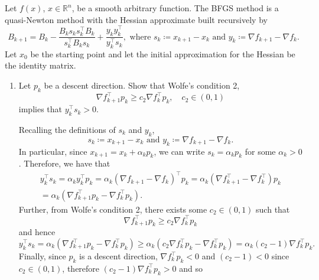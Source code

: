 \documentclass{../kin_math}
\begin{document}
\begin{questions}
  \question Let $f(x)$, $x \in \mathbb{R}^n$, be a smooth arbitrary function. The BFGS method is a quasi-Newton method with the Hessian approximate built recursively by
  \begin{equation*}
    B_{k + 1} = B_k - \frac{B_k s_k s_k^\top B_k}{s_k^\top B_k s_k} + \frac{y_k y_k^\top}{y_k^\top s_k}, \text{ where } s_k \coloneqq x_{k + 1} - x_k \text{ and } y_k \coloneqq \nabla f_{k + 1} - \nabla f_k.
  \end{equation*}
  Let $x_0$ be the starting point and let the initial approximation for the Hessian be the identity matrix.
  \begin{enumerate}
    \item Let $p_k$ be a descent direction. Show that Wolfe's condition 2,
    \begin{equation*}
      \nabla f_{k + 1}^\top p_k \geq c_2 \nabla f_k^\top p_k, \quad c_2 \in (0, 1)
    \end{equation*}
    implies that $y_k^\top s_k > 0$.
    \begin{solution}
      Recalling the definitions of $s_k$ and $y_k$,
      \begin{equation*}
        s_k \coloneqq x_{k + 1} - x_k \text{ and } y_k \coloneqq \nabla f_{k + 1} - \nabla f_k.
      \end{equation*}
      In particular, since $x_{k + 1} = x_k + \alpha_k p_k$, we can write $s_k = \alpha_k p_k$ for some $\alpha_k > 0$. Therefore, we have that
      \begin{multline*}
        y_k^\top s_k = \alpha_k y_k^\top p_k = \alpha_k (\nabla f_{k + 1} - \nabla f_k)^\top p_k = \alpha_k (\nabla f_{k + 1}^\top - \nabla f_k^\top) p_k \\
        = \alpha_k (\nabla f_{k + 1}^\top p_k - \nabla f_k^\top p_k).
      \end{multline*}
      Further, from Wolfe's condition 2, there exists some $c_2 \in (0, 1)$ such that
      \begin{equation*}
        \nabla f_{k + 1}^\top p_k \geq c_2 \nabla f_k^\top p_k
      \end{equation*}
      and hence
      \begin{equation*}
        y_k^\top s_k = \alpha_k (\nabla f_{k + 1}^\top p_k - \nabla f_k^\top p_k) \geq \alpha_k (c_2 \nabla f_k^\top p_k - \nabla f_k^\top p_k) = \alpha_k (c_2 - 1) \nabla f_k^\top p_k.
      \end{equation*}
      Finally, since $p_k$ is a descent direction, $\nabla f_k^\top p_k < 0$ and $(c_2 - 1) < 0$ since $c_2 \in (0, 1)$, therefore $(c_2 - 1) \nabla f_k^\top p_k > 0$ and so

\end{solution}
\end{enumerate}
\end{questions}
\end{document}
